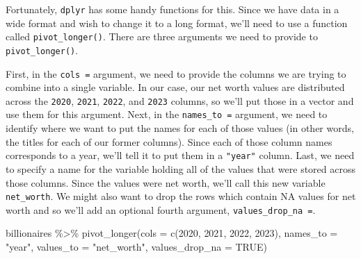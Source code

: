 \documentclass[
  letterpaper,
]{book}
\newenvironment{Shaded}{\begin{snugshade}}{\end{snugshade}}
\newcommand{\AttributeTok}[1]{\textcolor[rgb]{0.40,0.45,0.13}{#1}}
\newcommand{\ConstantTok}[1]{\textcolor[rgb]{0.56,0.35,0.01}{#1}}
\newcommand{\FunctionTok}[1]{\textcolor[rgb]{0.28,0.35,0.67}{#1}}
\newcommand{\NormalTok}[1]{\textcolor[rgb]{0.00,0.23,0.31}{#1}}
\newcommand{\SpecialCharTok}[1]{\textcolor[rgb]{0.37,0.37,0.37}{#1}}
\newcommand{\StringTok}[1]{\textcolor[rgb]{0.13,0.47,0.30}{#1}}
\begin{document}
Fortunately, \texttt{dplyr} has some handy functions for this. Since we
have data in a wide format and wish to change it to a long format, we'll
need to use a function called \texttt{pivot\_longer()}. There are three
arguments we need to provide to \texttt{pivot\_longer()}.

First, in the \texttt{cols\ =} argument, we need to provide the columns
we are trying to combine into a single variable. In our case, our net
worth values are distributed across the
\texttt{\textasciigrave{}2020\textasciigrave{}},
\texttt{\textasciigrave{}2021\textasciigrave{}},
\texttt{\textasciigrave{}2022\textasciigrave{}}, and
\texttt{\textasciigrave{}2023\textasciigrave{}} columns, so we'll put
those in a vector and use them for this argument. Next, in the
\texttt{names\_to\ =} argument, we need to identify where we want to put
the names for each of those values (in other words, the titles for each
of our former columns). Since each of those column names corresponds to
a year, we'll tell it to put them in a \texttt{"year"} column. Last, we
need to specify a name for the variable holding all of the values that
were stored across those columns. Since the values were net worth, we'll
call this new variable \texttt{net\_worth}. We might also want to drop
the rows which contain NA values for net worth and so we'll add an
optional fourth argument, \texttt{values\_drop\_na\ =}.

\begin{Shaded}
\begin{Highlighting}[]
\NormalTok{billionaires }\SpecialCharTok{\%\textgreater{}\%}
  \FunctionTok{pivot\_longer}\NormalTok{(}\AttributeTok{cols =} \FunctionTok{c}\NormalTok{(}\StringTok{\textasciigrave{}}\AttributeTok{2020}\StringTok{\textasciigrave{}}\NormalTok{, }\StringTok{\textasciigrave{}}\AttributeTok{2021}\StringTok{\textasciigrave{}}\NormalTok{, }\StringTok{\textasciigrave{}}\AttributeTok{2022}\StringTok{\textasciigrave{}}\NormalTok{, }\StringTok{\textasciigrave{}}\AttributeTok{2023}\StringTok{\textasciigrave{}}\NormalTok{),}
               \AttributeTok{names\_to =} \StringTok{"year"}\NormalTok{,}
               \AttributeTok{values\_to =} \StringTok{"net\_worth"}\NormalTok{,}
               \AttributeTok{values\_drop\_na =} \ConstantTok{TRUE}\NormalTok{)}
\end{Highlighting}
\end{Shaded}
\end{document}

